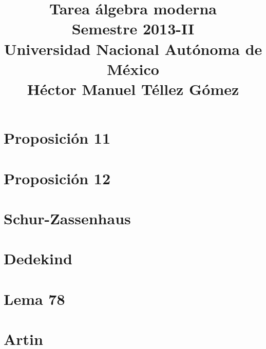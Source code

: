 \documentclass[a5paper,oneside]{amsart}
\title[Tarea álgebra moderna]{Tarea álgebra moderna\\ Semestre 2013-II\\ Universidad Nacional Autónoma de México\\ Héctor Manuel Téllez Gómez}
\theoremstyle{dotless}
\begin{document}
	\maketitle
    
	\section*{Proposición 11}
        
        \newpage
	
    \section*{Proposición 12}
        
        \newpage
    
    \section*{Schur-Zassenhaus}
        
        \newpage
        
    \section*{Dedekind}
        
        \newpage        
        
    \section*{Lema 78}
        
        \newpage
                    
    \section*{Artin}
                
\end{document}
